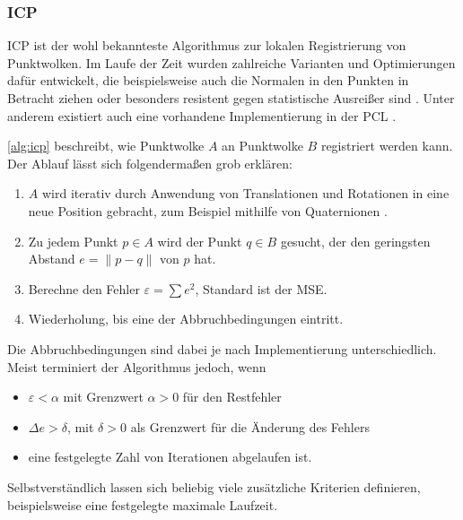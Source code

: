 \subsubsection{\acl{ICP}}
\label{subsubsec:icp}

\ac{ICP} \cite{besl1992method} ist der wohl bekannteste Algorithmus zur lokalen Registrierung von Punktwolken.
Im Laufe der Zeit wurden zahlreiche Varianten und Optimierungen dafür entwickelt, die beispielsweise auch die Normalen in den Punkten in Betracht ziehen oder besonders resistent gegen statistische Ausreißer sind \cite{rusinkiewicz2001efficient, bouaziz2013sparse, munch2010modified}. Unter anderem existiert auch eine vorhandene Implementierung in der \ac{PCL} \cite{holz2015registration}.

\autoref{alg:icp} beschreibt, wie Punktwolke $A$ an Punktwolke $B$ registriert werden kann.
Der Ablauf lässt sich folgendermaßen grob erklären:

\begin{enumerate}
\item $A$ wird iterativ durch Anwendung von Translationen und Rotationen in eine neue Position gebracht, zum Beispiel mithilfe von Quaternionen \cite{horn1987closed}.
\item Zu jedem Punkt $p \in A$ wird der Punkt $q \in B$ gesucht, der den geringsten Abstand $e = \|p - q\|$ von $p$ hat.
\item Berechne den Fehler $\varepsilon = \sum e^2$, Standard ist der \ac{MSE}.
\item Wiederholung, bis eine der Abbruchbedingungen eintritt.
\end{enumerate}

Die Abbruchbedingungen sind dabei je nach Implementierung unterschiedlich.
Meist terminiert der Algorithmus jedoch, wenn

\begin{itemize}
\item $\varepsilon < \alpha$ mit Grenzwert $\alpha > 0$ für den Restfehler
\item $\Delta e > \delta$, mit $\delta > 0$ als Grenzwert für die Änderung des Fehlers
\item eine festgelegte Zahl von Iterationen abgelaufen ist.
\end{itemize}

Selbstverständlich lassen sich beliebig viele zusätzliche Kriterien definieren, beispielsweise eine festgelegte maximale Laufzeit.


